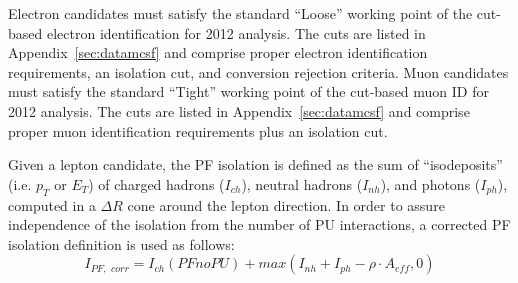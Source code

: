 Electron candidates must satisfy the standard ``Loose'' working point of the cut-based electron identification for 2012 analysis. The cuts are listed in Appendix~\ref{sec:datamcsf} and comprise proper electron identification requirements, an isolation cut, and conversion rejection criteria. Muon candidates must satisfy the standard ``Tight'' working point of the cut-based muon ID for 2012 analysis. The cuts are listed in Appendix~\ref{sec:datamcsf} and comprise proper muon identification requirements plus an isolation cut.

Given a lepton candidate, the PF isolation is defined as the sum of ``isodeposits'' (i.e. $p_T$ or $E_T$) of charged hadrons ($I_{ch}$), neutral hadrons ($I_{nh}$), and photons ($I_{ph}$), computed in a $\Delta R$ cone around the lepton direction. In order to assure independence of the isolation from the number of PU interactions, a corrected PF isolation definition is used as follows: 
\begin{equation} I_{PF, \,\, corr} = I_{ch}(PFnoPU) + max(I_{nh}+I_{ph}- \rho \cdot A_{eff} , 0) \end{equation}

